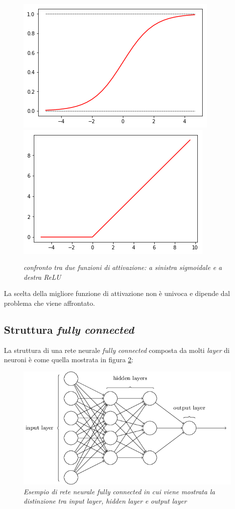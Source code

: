 \documentclass[12pt,a4paper]{report}
\begin{document}
\begin{figure}[H]
 \centering
 \includegraphics[scale = 0.5]{images/sigmoide.png}
 \includegraphics[scale = 0.5]{images/relu.png}
 \caption{\textit{confronto tra due funzioni di attivazione: a sinistra sigmoidale e a destra ReLU}}
 \label{sigmarelu}
\end{figure}

La scelta della migliore funzione di attivazione non è univoca e dipende dal problema che viene affrontato.

\subsection{Struttura \textit{fully connected}}

La struttura di una rete neurale \textit{fully connected} composta da molti \textit{layer} di neuroni è come quella mostrata in figura \ref{net}:

\begin{figure}[H]
 \centering
 \includegraphics[scale = 0.5]{images/net.png}
 \caption{\textit{Esempio di rete neurale fully connected in cui viene mostrata la distinzione tra input layer, hidden layer e output layer}}
 \label{net}
\end{figure} 
\end{document}
